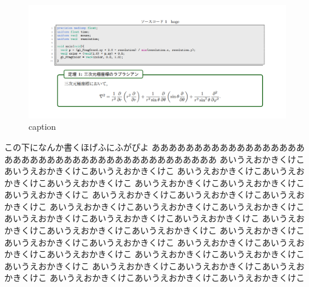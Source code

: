 \documentclass[uplatex,dvipdfmx,ja=standard,a4paper]{bxjsarticle}
\begin{document}
\begin{figure}
  \vspace*{-\intextsep}
  \includegraphics[width=10zw]{hoge.png}
  \caption{caption}
  \label{fig:wrap}
\end{figure}

この下になんか書くほげふにふがぴよ
ああああああああああああああああああ
あああああああああああああああああああああああああ
あいうえおかきくけこあいうえおかきくけこあいうえおかきくけこ
あいうえおかきくけこあいうえおかきくけこあいうえおかきくけこ
あいうえおかきくけこあいうえおかきくけこあいうえおかきくけこ
あいうえおかきくけこあいうえおかきくけこあいうえおかきくけこ
あいうえおかきくけこあいうえおかきくけこあいうえおかきくけこ
あいうえおかきくけこあいうえおかきくけこあいうえおかきくけこ
あいうえおかきくけこあいうえおかきくけこあいうえおかきくけこ
あいうえおかきくけこあいうえおかきくけこあいうえおかきくけこ
あいうえおかきくけこあいうえおかきくけこあいうえおかきくけこ
あいうえおかきくけこあいうえおかきくけこあいうえおかきくけこ
あいうえおかきくけこあいうえおかきくけこあいうえおかきくけこ
あいうえおかきくけこあいうえおかきくけこあいうえおかきくけこ
\end{document}
